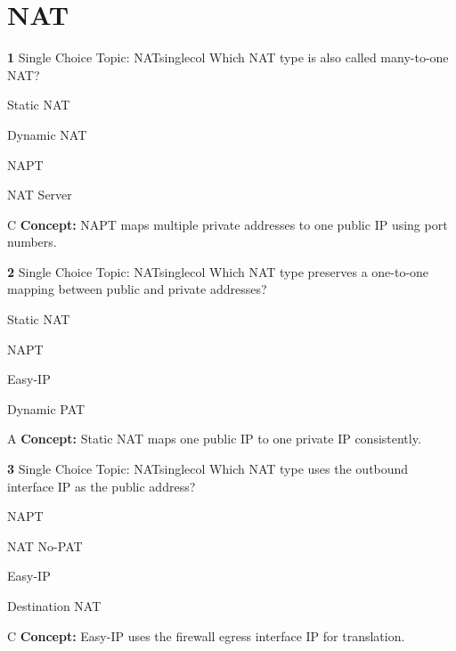 \documentclass[10pt,a4paper]{article}
\begin{document}
\section{NAT}
\begin{qcard}{\color{white}\textbf{1} \hfill \small Single Choice \textbar{} Topic: NAT}{singlecol}
Which NAT type is also called many-to-one NAT?

\begin{qoptions}
\item Static NAT
\item Dynamic NAT
\item NAPT
\item NAT Server
\end{qoptions}
\begin{explainbox}{C}
\textbf{Concept:} NAPT maps multiple private addresses to one public IP using port numbers.
\end{explainbox}
\end{qcard}

\begin{qcard}{\color{white}\textbf{2} \hfill \small Single Choice \textbar{} Topic: NAT}{singlecol}
Which NAT type preserves a one-to-one mapping between public and private addresses?

\begin{qoptions}
\item Static NAT
\item NAPT
\item Easy-IP
\item Dynamic PAT
\end{qoptions}
\begin{explainbox}{A}
\textbf{Concept:} Static NAT maps one public IP to one private IP consistently.
\end{explainbox}
\end{qcard}

\begin{qcard}{\color{white}\textbf{3} \hfill \small Single Choice \textbar{} Topic: NAT}{singlecol}
Which NAT type uses the outbound interface IP as the public address?

\begin{qoptions}
\item NAPT
\item NAT No-PAT
\item Easy-IP
\item Destination NAT
\end{qoptions}
\begin{explainbox}{C}
\textbf{Concept:} Easy-IP uses the firewall egress interface IP for translation.
\end{explainbox}
\end{qcard}
\end{document}
